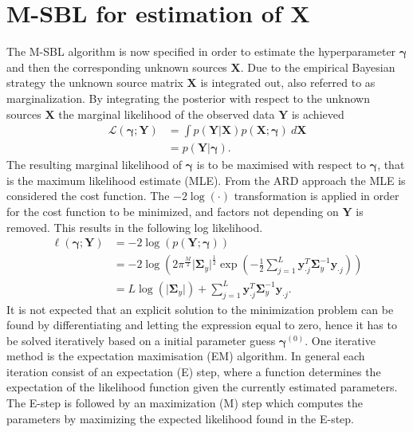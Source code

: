 \section{M-SBL for estimation of $\textbf{X}$}\label{seg:M_sblalg}
The M-SBL algorithm is now specified in order to estimate the hyperparameter $\boldsymbol{\gamma}$ and then the corresponding unknown sources $\textbf{X}$.
Due to the empirical Bayesian strategy the unknown source matrix $\mathbf{X}$ is integrated out, also referred to as marginalization.
By integrating the posterior with respect to the unknown sources $\mathbf{X}$ the marginal likelihood of the observed data $\mathbf{Y}$ is achieved \cite[p. 146]{phd_wipf} 
\begin{align*}
\mathcal{L}(\boldsymbol{\gamma};\textbf{Y}) &= \int p (\mathbf{Y}  \vert \mathbf{X}) p (\mathbf{X} ; \boldsymbol{\gamma}) \ d\mathbf{X} \\
&= p (\mathbf{Y} \vert \boldsymbol{\gamma}).
\end{align*}
The resulting marginal likelihood of $\boldsymbol{\gamma}$ is to be maximised with respect to $\boldsymbol{\gamma}$, that is the maximum likelihood estimate (MLE). From the ARD approach the MLE is considered the cost function. 
The $-2 \log (\cdot)$ transformation is applied in order for the cost function to be minimized, and factors not depending on $\textbf{Y}$ is removed. This results in the following log likelihood. 
\begin{align}
\ell(\boldsymbol{\gamma};\textbf{Y})&= - 2 \log(p (\mathbf{Y} ; \boldsymbol{\gamma}))\nonumber \\ 
&= -2\log \left( 2\pi^{\frac{M}{2}}\vert \boldsymbol{\Sigma}_{y}\vert^{\frac{1}{2}}\exp \left( - \frac{1}{2} \sum_{j=1}^L \textbf{y}_{\cdot j}^T \boldsymbol{\Sigma}_{y}^{-1} \textbf{y}_{\cdot j} \right) \right)\nonumber \\
&= L \log ( \vert \boldsymbol{\Sigma}_y \vert ) + \sum_{j=1}^L \mathbf{y}_{\cdot j}^T \boldsymbol{\Sigma}_y ^{-1} \mathbf{y}_{\cdot j}.\label{eq:likelihood}
\end{align}
It is not expected that an explicit solution to the minimization problem can be found by differentiating and letting the expression equal to zero, hence it has to be solved iteratively based on a initial parameter guess $\boldsymbol{\gamma}^{(0)}$.
One iterative method is the expectation maximisation (EM) algorithm.
In general each iteration consist of an expectation (E) step, where a function determines the expectation of the likelihood function given the currently estimated parameters. The E-step is followed by an maximization (M) step which computes the parameters by maximizing the expected likelihood found in the E-step.

